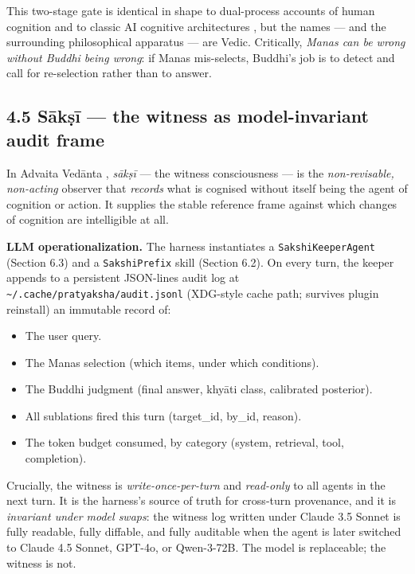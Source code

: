 This two-stage gate is identical in shape to dual-process accounts of human cognition \citep{evans2003duality, kahneman2011thinking, sloman1996two} and to classic AI cognitive architectures \citep{laird1987soar, anderson1996actr, newell1990unified}, but the names --- and the surrounding philosophical apparatus --- are Vedic. Critically, \emph{Manas can be wrong without Buddhi being wrong}: if Manas mis-selects, Buddhi's job is to detect and call for re-selection rather than to answer.

\subsection{4.5 Sākṣī --- the witness as model-invariant audit frame}\label{sux101kux1e63ux12b-the-witness-as-model-invariant-audit-frame}

In Advaita Vedānta \citep{indich1980consciousness, fasching2009witness, ganeri2017concealed, sankaraupadesha}, \emph{sākṣī} --- the witness consciousness --- is the \emph{non-revisable, non-acting} observer that \emph{records} what is cognised without itself being the agent of cognition or action. It supplies the stable reference frame against which changes of cognition are intelligible at all.

\textbf{LLM operationalization.} The harness instantiates a \texttt{SakshiKeeperAgent} (Section 6.3) and a \texttt{SakshiPrefix} skill (Section 6.2). On every turn, the keeper appends to a persistent JSON-lines audit log at \texttt{\textasciitilde{}/.cache/pratyaksha/audit.jsonl} (XDG-style cache path; survives plugin reinstall) an immutable record of:

\begin{itemize}
\tightlist
\item
  The user query.
\item
  The Manas selection (which items, under which conditions).
\item
  The Buddhi judgment (final answer, khyāti class, calibrated posterior).
\item
  All sublations fired this turn (target\_id, by\_id, reason).
\item
  The token budget consumed, by category (system, retrieval, tool, completion).
\end{itemize}

Crucially, the witness is \emph{write-once-per-turn} and \emph{read-only} to all agents in the next turn. It is the harness's source of truth for cross-turn provenance, and it is \emph{invariant under model swaps}: the witness log written under Claude 3.5 Sonnet is fully readable, fully diffable, and fully auditable when the agent is later switched to Claude 4.5 Sonnet, GPT-4o, or Qwen-3-72B. The model is replaceable; the witness is not.

